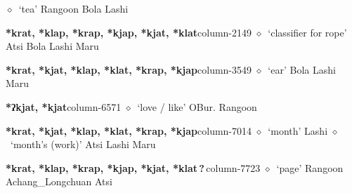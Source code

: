          $\diamond$~`tea'
         Rangoon 
\hspace{1ex}
         Bola 
\hspace{1ex}
         Lashi 
  \item {\footnotesize \textbf{*krat, *klap, *krap, *kjap, *kjat, *klat}}{\tiny column-2149}
         $\diamond$~`classifier for rope'
         Atsi 
\hspace{1ex}
         Bola 
\hspace{1ex}
         Lashi 
\hspace{1ex}
         Maru 
  \item {\footnotesize \textbf{*krat, *kjat, *klap, *klat, *krap, *kjap}}{\tiny column-3549}
         $\diamond$~`ear'
         Bola 
\hspace{1ex}
         Lashi 
\hspace{1ex}
         Maru 
  \item {\footnotesize \textbf{*ʔkjat, *kjat}}{\tiny column-6571}
         $\diamond$~`love / like'
         OBur. 
\hspace{1ex}
         Rangoon 
  \item {\footnotesize \textbf{*krat, *kjat, *klap, *klat, *krap, *kjap}}{\tiny column-7014}
         $\diamond$~`month'
         Lashi 
\hspace{1ex}
         $\diamond$~`month's (work)'
         Atsi 
\hspace{1ex}
         Lashi 
\hspace{1ex}
         Maru 
  \item {\footnotesize \textbf{*krat, *klap, *krap, *kjap, *kjat, *klat\,?\,}}{\tiny column-7723}
         $\diamond$~`page'
         Rangoon 
\hspace{1ex}
         Achang\_Longchuan 
\hspace{1ex}
         Atsi 
\hspace{1ex}
